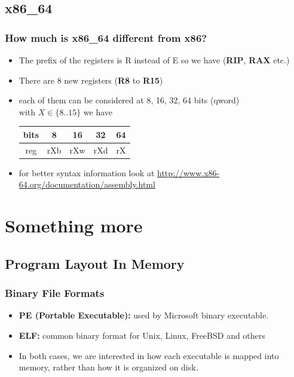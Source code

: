 \documentclass[]{beamer}
\newenvironment{changemargin}[2]{%
  \begin{list}{}{%
      \setlength{\topsep}{0pt}%
      \setlength{\leftmargin}{#1}%
      \setlength{\rightmargin}{#2}%
      \setlength{\listparindent}{\parindent}%
      \setlength{\itemindent}{\parindent}%
      \setlength{\parsep}{\parskip}%
    }%
  \item[]}{\end{list}}
\begin{document}
\subsection{x86\_64}
\begin{frame}
  \frametitle{How much is x86\_64 different from x86?}
  \begin{changemargin}{-0.7cm}{0cm}
    \begin{itemize}
    \item{The prefix of  the registers is R instead of E so we have ({\bf RIP}, {\bf RAX} etc.)}
    \item{There are 8 new registers ({\bf R8} to {\bf R15})}
    \item{each of them can be considered at 8, 16, 32, 64 bits (qword)\\
        with $X \in \{8..15\}$ we have }
      \begin{table}[h]
        \begin{tabular}{|c!{\vrule width 1pt }c|c|c|c|}
          \hline
          bits&8&16&32&64\\
          \hline
          reg&rXb&rXw&rXd&rX\\
          \hline
        \end{tabular}
      \end{table}
    \item{for better syntax information look at \url{http://www.x86-64.org/documentation/assembly.html}}
    \end{itemize}
  \end{changemargin}
\end{frame}
\section{Something more}

\subsection{Program Layout In Memory}

\begin{frame}
  \frametitle{Binary File Formats}
  \begin{itemize}
  \item{\textbf{PE (Portable Executable):} used by Microsoft binary executable.}
  \item{\textbf{ELF:} common binary format for Unix, Linux, FreeBSD and others}
  \item In both cases, we are interested in how each executable is
    mapped into memory, rather than how it is organized on disk.
  \end{itemize}
\end{frame}
\end{document}
